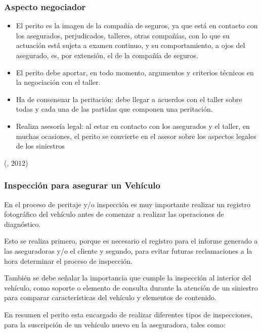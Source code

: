 \subsubsection{Aspecto negociador}
\begin{itemize}

\item El perito es la imagen de la compañía de seguros, ya que está en contacto con los asegurados, perjudicados, talleres, otras compañías, con lo que su actuación está sujeta a examen continuo, y su comportamiento, a ojos del asegurado, es, por extensión, el de la compañía de seguros. 

\item El perito debe aportar, en todo momento, argumentos y criterios técnicos en la negociación con el taller.

\item Ha de consensuar la peritación: debe llegar a acuerdos con el taller sobre todas y cada una de las partidas que componen una peritación.

\item Realiza asesoría legal: al estar en contacto con los asegurados y el taller, en muchas ocasiones, el perito se convierte en el asesor sobre los aspectos legales de los siniestros

\end{itemize}


(\citet{peritobib}, 2012)
\subsubsection{Inspección para asegurar un Vehículo}

En el proceso de peritaje y/o inspección es muy importante realizar un registro fotográfico del vehículo antes de comenzar a realizar las operaciones de diagnóstico.

Esto se realiza primero, porque es necesario el registro para el informe generado a las aseguradoras y/o el cliente y segundo, para evitar futuras reclamaciones a la hora determinar el proceso de inspección.

También se debe señalar la importancia que cumple la inspección al interior del vehículo, como soporte o elemento de consulta durante la atención de un siniestro para comparar características del vehículo y elementos de contenido.

En resumen el perito esta encargado de realizar diferentes tipos de inspecciones, para la suscripción de un vehículo nuevo en la aseguradora, tales como:

